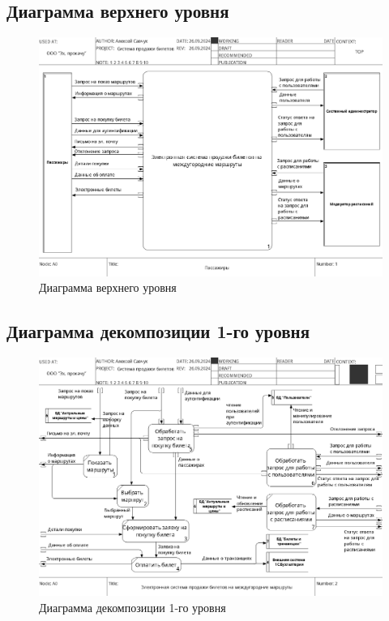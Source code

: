 \subsection{Диаграмма верхнего уровня}

\begin{figure}[H]
    \centering
    \includegraphics[width=\linewidth]{model/A0.png}
    \caption{Диаграмма верхнего уровня}
\end{figure}

\newpage
\subsection{Диаграмма декомпозиции 1-го уровня}

\begin{figure}[H]
    \centering
    \includegraphics[width=\linewidth]{model/A1.png}
    \caption{Диаграмма декомпозиции 1-го уровня}
\end{figure}

